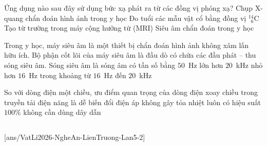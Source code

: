 	\begin{ex}%
		Ứng dụng nào sau đây sử dụng bức xạ phát ra từ các đồng vị phóng xạ?
		\choice
		{Chụp X-quang chẩn đoán hình ảnh trong y học}
		{\True Đo tuổi các mẫu vật cổ bằng đồng vị ${}^{14}_{\phantom{1}6}\text{C}$}
		{Tạo từ trường trong máy cộng hưởng từ (MRI)}
		{Siêu âm chẩn đoán trong y học}
	\end{ex}

	\begin{ex}%
		Trong y học, máy siêu âm là một thiết bị chẩn đoán hình ảnh không xâm lấn hữu ích. Bộ phận cốt lõi của máy siêu âm là đầu dò có chứa các đầu phát -- thu sóng siêu âm. Sóng siêu âm là sóng âm có tần số
		\choice
		{bằng $50$~Hz}
		{\True lớn hơn $20$~kHz}
		{nhỏ hơn $16$~Hz}
		{trong khoảng từ $16$~Hz đến $20$~kHz}
	\end{ex}

	\begin{ex}%
		So với dòng điện một chiều, ưu điểm quan trọng của dòng điện xoay chiều trong truyền tải điện năng là
		\choice
		{\True dễ biến đổi điện áp}
		{không gây tỏa nhiệt}
		{luôn có hiệu suất $100\%$}
		{không cần dùng dây dẫn}
	\end{ex}

	\subsection*{}
	\setcounter{ex}{0}
	[ans/VatLi2026-NgheAn-LienTruong-Lan5-2]


